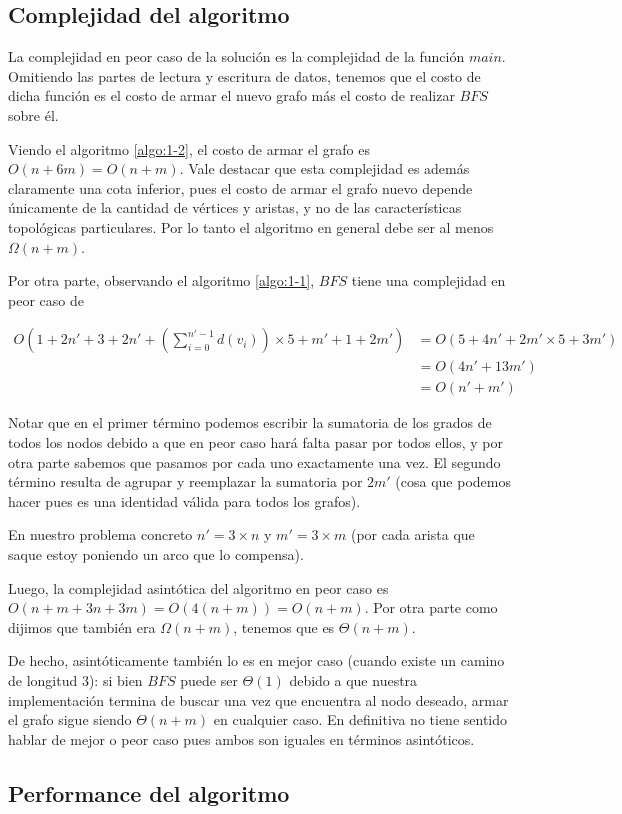 \subsection{Complejidad del algoritmo}
La complejidad en peor caso de la solución es la complejidad de la función $main$. Omitiendo las partes de lectura y escritura de datos, tenemos que el costo de dicha función es el costo de armar el nuevo grafo más el costo de realizar $BFS$ sobre él.

Viendo el algoritmo \ref{algo:1-2}, el costo de armar el grafo es $O(n+6m) = O(n+m)$. Vale destacar que esta complejidad es además claramente una cota inferior, pues el costo de armar el grafo nuevo depende únicamente de la cantidad de vértices y aristas, y no de las características topológicas particulares. Por lo tanto el algoritmo en general debe ser al menos $\Omega(n+m)$.

Por otra parte, observando el algoritmo \ref{algo:1-1}, $BFS$ tiene una complejidad en peor caso de 

\begin{equation}
\begin{aligned}
	O(1+2n'+3+2n'+(\sum_{i=0}^{n'-1}d(v_{i}))\times 5 + m' + 1 + 2m') & = O(5+4n'+2m'\times 5 + 3m') \\
	&= O(4n'+13m') \\
	&= O(n'+m')
\end{aligned}
\end{equation}

Notar que en el primer término podemos escribir la sumatoria de los grados de todos los nodos debido a que en peor caso hará falta pasar por todos ellos, y por otra parte sabemos que pasamos por cada uno exactamente una vez. El segundo término resulta de agrupar y reemplazar la sumatoria por $2m'$ (cosa que podemos hacer pues es una identidad válida para todos los grafos).

En nuestro problema concreto $n'=3\times n$ y $m' = 3\times m$ (por cada arista que saque estoy poniendo un arco que lo compensa).

Luego, la complejidad asintótica del algoritmo en peor caso es $O(n+m+3n+3m) = O(4(n+m)) = O(n+m)$. Por otra parte como dijimos que también era $\Omega(n+m)$, tenemos que es $\Theta(n+m)$.

De hecho, asintóticamente también lo es en mejor caso (cuando existe un camino de longitud 3): si bien $BFS$ puede ser $\Theta(1)$ debido a que nuestra implementación termina de buscar una vez que encuentra al nodo deseado, armar el grafo sigue siendo $\Theta(n+m)$ en cualquier caso. En definitiva no tiene sentido hablar de mejor o peor caso pues ambos son iguales en términos asintóticos.

\subsection{Performance del algoritmo}


